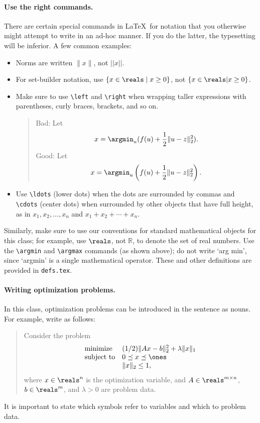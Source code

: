 \documentclass[12pt]{article}
\begin{document}
\paragraph{Use the right commands.}
There are certain special commands in \LaTeX\ for notation that you otherwise
might attempt to write in an ad-hoc manner. If you do the latter, the typesetting
will be inferior. A few common examples:
\begin{itemize}
\item Norms are written $\|x\|$, not $||x||$. 

\item For set-builder notation, use
$\{ x \in \reals \mid x \geq 0 \}$, not $\{x \in \reals | x \geq 0 \}$.

\item Make sure to use \verb|\left| and \verb|\right| when wrapping
taller expressions with parentheses, curly braces, brackets, and so on.
\begin{quote}
Bad: Let
\[
    x = \argmin_u (f(u) + \frac{1}{2}\|u - z\|_2^2).
\]
Good: Let
\[
    x = \argmin_u \left(f(u) + \frac{1}{2}\|u - z\|_2^2\right).
\]
\end{quote}

\item Use \verb|\ldots| (lower dots) when the dots are surrounded by commas and
\verb|\cdots| (center dots) when surrounded by other objects that have full
height, as in $x_1, x_2, \ldots, x_n$ and $x_1 + x_2 + \cdots + x_n$.
\end{itemize}
Similarly, make sure to use our conventions for standard mathematical objects
for this class; for example, use $\reals$, not $\mathbb{R}$, to denote the set
of real numbers. Use the \verb|\argmin| and \verb|\argmax| commands (as shown
above); do not write `arg min', since `argmin' is a single mathematical
operator.  These and other definitions are provided in \verb|defs.tex|.

\paragraph{Writing optimization problems.}
In this class, optimization problems can be introduced in the sentence as
nouns. For example, write as follows:
\begin{quote}
Consider the problem
    \begin{equation}
    \begin{array}{ll}
    \mbox{minimize}   & (1/2)\|Ax-b\|_2^2 + \lambda \|x\|_1 \\
    \mbox{subject to} & 0 \preceq x \preceq \ones \\
    & \|x\|_2 \leq 1,
    \end{array}
    \label{e-opt-prob}
    \end{equation}
where $x \in \reals^n$ is the optimization variable, and $A \in \reals^{m
\times n}$, $b \in \reals^m$, and $\lambda > 0$ are problem data.
\end{quote}
It is important to state which symbols refer to variables and which to problem data.
\end{document}
